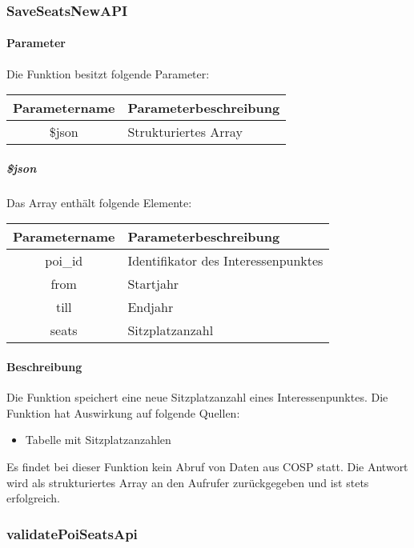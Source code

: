 \subsubsection{SaveSeatsNewAPI}
\paragraph{Parameter} Die Funktion besitzt folgende Parameter:
\begin{table}[H]
	\begin{tabular}{|c|p{11cm}|}
		\hline
		\textbf{Parametername} & \textbf{Parameterbeschreibung} \\ \hline
		\$json & Strukturiertes Array \\ \hline
	\end{tabular}
\end{table}
\subparagraph{\$json}Das Array enthält folgende Elemente:
\begin{table}[H]
	\begin{tabular}{|c|p{11cm}|}
		\hline
		\textbf{Parametername} & \textbf{Parameterbeschreibung} \\ \hline
		poi\_id  & Identifikator des Interessenpunktes \\ \hline
		from     & Startjahr \\ \hline
		till     & Endjahr \\ \hline
		seats    & Sitzplatzanzahl \\ \hline
	\end{tabular}
\end{table}
\paragraph{Beschreibung} Die Funktion speichert eine neue Sitzplatzanzahl eines Interessenpunktes. Die Funktion hat Auswirkung auf folgende Quellen:
\begin{itemize}
	\item Tabelle mit Sitzplatzanzahlen
\end{itemize}
Es findet bei dieser Funktion kein Abruf von Daten aus {\glqq COSP\grqq} statt. Die Antwort wird als strukturiertes Array an den Aufrufer zurückgegeben und ist stets erfolgreich.
\subsubsection{validatePoiSeatsApi}
